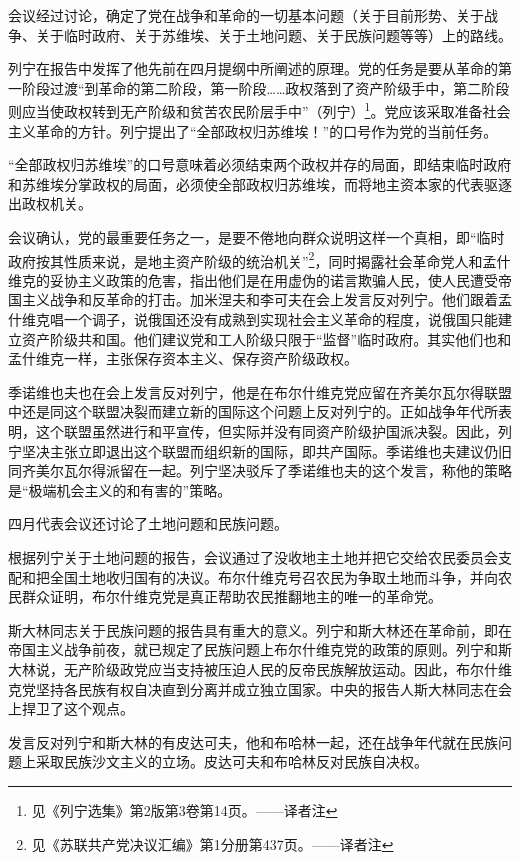 会议经过讨论，确定了党在战争和革命的一切基本问题（关于目前形势、关于战争、关于临时政府、关于苏维埃、关于土地问题、关于民族问题等等）上的路线。

列宁在报告中发挥了他先前在四月提纲中所阐述的原理。党的任务是要从革命的第一阶段过渡“到革命的第二阶段，第一阶段……政权落到了资产阶级手中，第二阶段则应当使政权转到无产阶级和贫苦农民阶层手中”（列宁）\footnote{见《列宁选集》第2版第3卷第14页。——译者注}。党应该采取准备社会主义革命的方针。列宁提出了“全部政权归苏维埃！”的口号作为党的当前任务。

“全部政权归苏维埃”的口号意味着必须结束两个政权并存的局面，即结束临时政府和苏维埃分掌政权的局面，必须使全部政权归苏维埃，而将地主资本家的代表驱逐出政权机关。

会议确认，党的最重要任务之一，是要不倦地向群众说明这样一个真相，即“临时政府按其性质来说，是地主资产阶级的统治机关”\footnote{见《苏联共产党决议汇编》第1分册第437页。——译者注}，同时揭露社会革命党人和孟什维克的妥协主义政策的危害，指出他们是在用虚伪的诺言欺骗人民，使人民遭受帝国主义战争和反革命的打击。加米涅夫和李可夫在会上发言反对列宁。他们跟着孟什维克唱一个调子，说俄国还没有成熟到实现社会主义革命的程度，说俄国只能建立资产阶级共和国。他们建议党和工人阶级只限于“监督”临时政府。其实他们也和孟什维克一样，主张保存资本主义、保存资产阶级政权。

季诺维也夫也在会上发言反对列宁，他是在布尔什维克党应留在齐美尔瓦尔得联盟中还是同这个联盟决裂而建立新的国际这个问题上反对列宁的。正如战争年代所表明，这个联盟虽然进行和平宣传，但实际并没有同资产阶级护国派决裂。因此，列宁坚决主张立即退出这个联盟而组织新的国际，即共产国际。季诺维也夫建议仍旧同齐美尔瓦尔得派留在一起。列宁坚决驳斥了季诺维也夫的这个发言，称他的策略是“极端机会主义的和有害的”策略。

四月代表会议还讨论了土地问题和民族问题。

根据列宁关于土地问题的报告，会议通过了没收地主土地并把它交给农民委员会支配和把全国土地收归国有的决议。布尔什维克号召农民为争取土地而斗争，并向农民群众证明，布尔什维克党是真正帮助农民推翻地主的唯一的革命党。

斯大林同志关于民族问题的报告具有重大的意义。列宁和斯大林还在革命前，即在帝国主义战争前夜，就已规定了民族问题上布尔什维克党的政策的原则。列宁和斯大林说，无产阶级政党应当支持被压迫人民的反帝民族解放运动。因此，布尔什维克党坚持各民族有权自决直到分离并成立独立国家。中央的报告人斯大林同志在会上捍卫了这个观点。

发言反对列宁和斯大林的有皮达可夫，他和布哈林一起，还在战争年代就在民族问题上采取民族沙文主义的立场。皮达可夫和布哈林反对民族自决权。

